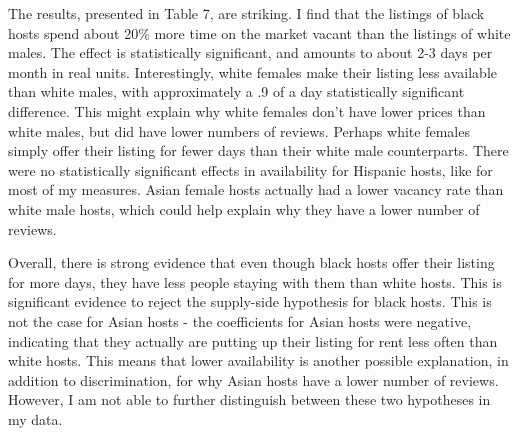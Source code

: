 The results, presented in Table 7, are striking. I find that the listings of black hosts spend about 20\% more time on the market vacant than the listings of white males. The effect is statistically significant, and amounts to about 2-3 days per month in real units. Interestingly, white females make their listing less available than white males, with approximately a .9 of a day statistically significant difference. This might explain why white females don't have lower prices than white males, but did have lower numbers of reviews. Perhaps white females simply offer their listing for fewer days than their white male counterparts. There were no statistically significant effects in availability for Hispanic hosts, like for most of my measures. Asian female hosts actually had a lower vacancy rate than white male hosts, which could help explain why they have a lower number of reviews. 

Overall, there is strong evidence that even though black hosts offer their listing for more days, they have less people staying with them than white hosts. This is significant evidence to reject the supply-side hypothesis for black hosts. This is not the case for Asian hosts - the coefficients for Asian hosts were negative, indicating that they actually are putting up their listing for rent less often than white hosts. This means that lower availability is another possible explanation, in addition to discrimination, for why Asian hosts have a lower number of reviews. However, I am not able to further distinguish between these two hypotheses in my data.  
